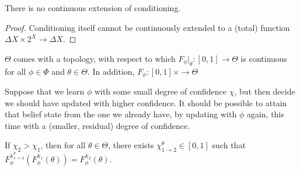 %
\begin{prop}
	There is no continuous extension of conditioning.
\end{prop}
\begin{proof}
	Conditioning itself cannot be continuously 
	extended to a (total) function $\Delta X \times 2^X \to \Delta X$.
\end{proof}

\begin{CFaxioms}[nosep]
	\item
	$\Theta$ comes with a topology, with respect to which
	$F_{\phi}|_\theta : [0,1] \to \Theta$ is continuous
	for all $\phi \in \Phi$ and $\theta \in \Theta$.
	In addition,
	$F_{\phi} : [0,1] \times \to \Theta$
	\label{ax:cont}
\end{CFaxioms}

Suppose that we learn $\phi$ with some small degree of confidence $\chi$,
but then decide we should have updated with higher confidence. 
It should be possible to attain that belief state from the one we already
have, by updating with $\phi$ again, this time with a (smaller, residual) 
degree of confidence.

\begin{CFaxioms}
	\item 
	If $\chi_2 > \chi_1$, then for all $\theta \in \Theta$, 
	there exists 
	$\chi_{1{\to}2}^\theta \in [0,1]$
	such that
	$
	F_\phi^{\chi_{1{\to}2}^\theta}(F_\phi^{\chi_1}(\theta)) = F_\phi^{\chi_2}(\theta).
	$
	\label{ax:seq-for-more}
\end{CFaxioms}

